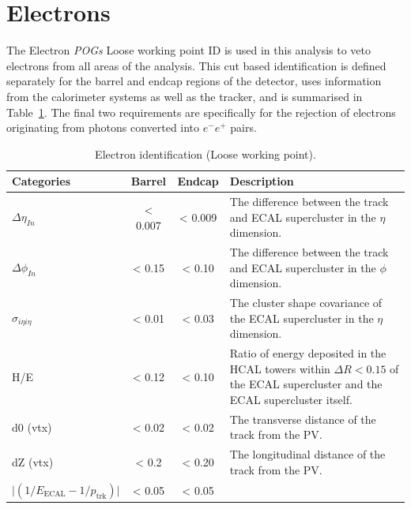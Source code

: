 \section{Electrons}  %
\label{sec:objects_electrons}
The Electron \emph{POGs} Loose working point ID \cite{ref:electronidtwiki} is
used in this analysis to veto 
electrons from all areas of the analysis. This cut based identification is 
defined separately for the barrel and endcap regions of the detector, uses
information
from the calorimeter systems as well as the tracker, and is
summarised in Table~\ref{tab:ele-id}. The final two requirements are
specifically for the rejection of electrons originating from photons converted
into $e^-e^+$ pairs.

\begin{table}[h]
  \caption{Electron identification (Loose working point).\label{tab:ele-id}}
  \centering
  \scriptsize
  \begin{tabular}{ lccp{8.8cm} }
    \hline
    \hline
    Categories                                               & Barrel    &
    Endcap    & 
    Description \\
    \hline
    $\Delta \eta_{In}$                                       & < 0.007     &
    < 0.009     & 
    The difference between the track and ECAL supercluster in the $\eta$ dimension. \\
    $\Delta \phi_{In}$                                       & < 0.15      &
    < 0.10      &
    The difference between the track and ECAL supercluster in the $\phi$ dimension. \\
    $\sigma_{i\eta i\eta}$                                   & < 0.01      &
    < 0.03      & 
    The cluster shape covariance of the ECAL supercluster in the $\eta$ dimension. \\
    H/E                                                      & < 0.12      & < 0.10      &
    Ratio of energy deposited in the HCAL towers within $\Delta R<0.15$ of the ECAL 
    supercluster and the ECAL supercluster itself. \\
    d0 (vtx)                                                 & < 0.02      & < 0.02      &
    The transverse distance of the track from the PV. \\
    dZ (vtx)                                                 & < 0.2       & < 0.20      &
    The longitudinal distance of the track from the PV. \\
    $\lvert(1/E_{\textrm{ECAL}} - 1/p_{\textrm{trk}})\rvert$ & < 0.05      & < 0.05      &

\end{tabular}
\end{table}
